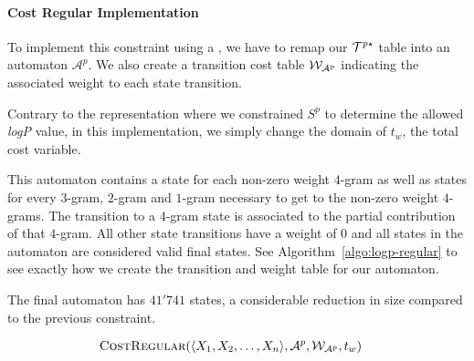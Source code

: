\documentclass[../Document.tex]{subfiles}
\begin{document}
\paragraph{Cost Regular Implementation}
To implement this constraint using a \costregular, we have to remap our ${\cal T}^{p\star}$ table into an automaton $\mathcal{A}^p$. We also create a transition cost table ${\cal W}_{\mathcal{A}^p}$ indicating the associated weight to each state transition.

Contrary to the \shortTable representation where we constrained $S^p$ to determine the allowed \emph{logP} value, in this implementation, we simply change the domain of $t_w$, the total cost variable.

This automaton contains a state for each non-zero weight $4$-gram as well as states for every $3$-gram, $2$-gram and $1$-gram necessary to get to the non-zero weight $4$-grams.
The transition to a $4$-gram state is associated to the partial contribution of that $4$-gram.
All other state transitions have a weight of 0 and all states in the automaton are considered valid final states.
See Algorithm~\ref{algo:logp-regular} to see exactly how we create the transition and weight table for our automaton.

The final automaton has $41'741$ states, a considerable reduction in size compared to the previous \shortTable constraint.

\begin{align*}
    &\mbox{\sc CostRegular}(\langle X_1, X_2, \ldots, X_n \rangle, \mathcal{A}^p, {\cal W}_{\mathcal{A}^p}, t_w)
\end{align*}
\end{document}
